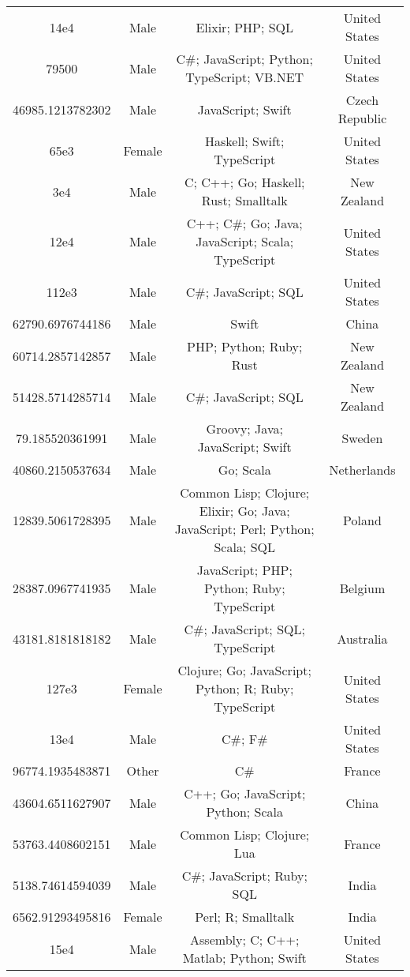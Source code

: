 \begin{center}
\begin{tabular}{ |c|c|c|c| }
14e4  &  Male  &  Elixir; PHP; SQL  &  United States  \\ 
79500  &  Male  &  C\#; JavaScript; Python; TypeScript; VB.NET  &  United States  \\ 
46985.1213782302  &  Male  &  JavaScript; Swift  &  Czech Republic  \\ 
65e3  &  Female  &  Haskell; Swift; TypeScript  &  United States  \\ 
3e4  &  Male  &  C; C++; Go; Haskell; Rust; Smalltalk  &  New Zealand  \\ 
12e4  &  Male  &  C++; C\#; Go; Java; JavaScript; Scala; TypeScript  &  United States  \\ 
112e3  &  Male  &  C\#; JavaScript; SQL  &  United States  \\ 
62790.6976744186  &  Male  &  Swift  &  China  \\ 
60714.2857142857  &  Male  &  PHP; Python; Ruby; Rust  &  New Zealand  \\ 
51428.5714285714  &  Male  &  C\#; JavaScript; SQL  &  New Zealand  \\ 
79.185520361991  &  Male  &  Groovy; Java; JavaScript; Swift  &  Sweden  \\ 
40860.2150537634  &  Male  &  Go; Scala  &  Netherlands  \\ 
12839.5061728395  &  Male  &  Common Lisp; Clojure; Elixir; Go; Java; JavaScript; Perl; Python; Scala; SQL  &  Poland  \\ 
28387.0967741935  &  Male  &  JavaScript; PHP; Python; Ruby; TypeScript  &  Belgium  \\ 
43181.8181818182  &  Male  &  C\#; JavaScript; SQL; TypeScript  &  Australia  \\ 
127e3  &  Female  &  Clojure; Go; JavaScript; Python; R; Ruby; TypeScript  &  United States  \\ 
13e4  &  Male  &  C\#; F\#  &  United States  \\ 
96774.1935483871  &  Other  &  C\#  &  France  \\ 
43604.6511627907  &  Male  &  C++; Go; JavaScript; Python; Scala  &  China  \\ 
53763.4408602151  &  Male  &  Common Lisp; Clojure; Lua  &  France  \\ 
5138.74614594039  &  Male  &  C\#; JavaScript; Ruby; SQL  &  India  \\ 
6562.91293495816  &  Female  &  Perl; R; Smalltalk  &  India  \\ 
15e4  &  Male  &  Assembly; C; C++; Matlab; Python; Swift  &  United States  \\ 

\end{tabular}
\end{center}
